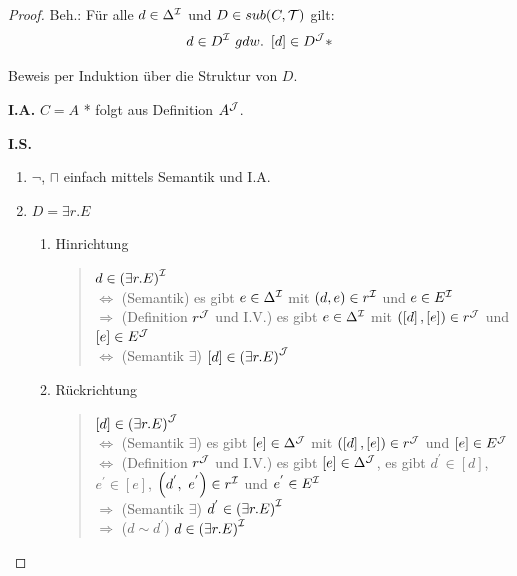 \begin{proof}
Beh.: Für alle $d \in \Delta^{\mathcal{I}}$ und $D \in sub(C,\mathcal{T})$ gilt: $$d \in D^{\MI}\ gdw.\ \left\lbrack d \right\rbrack \in D^{\MJ}*$$

Beweis per Induktion über die Struktur von $D$.

\textbf{I.A.} $C = A$ * folgt aus Definition $A^{\mathcal{J}}$.

\textbf{I.S.}

\begin{enumerate}
\def\labelenumi{\arabic{enumi}.}
\item
  $\neg$, $\sqcap$ einfach mittels Semantik und I.A.
\item
  $D = \exists r.E$

  \begin{enumerate}
  \def\labelenumii{\alph{enumii}.}
  \item
    Hinrichtung

\begin{quote}
$d \in \left( \exists r.E \right)^{\mathcal{I}}$ \\
$\Leftrightarrow$ (Semantik) es gibt $e \in \Delta^{\mathcal{I}}$ mit $\left( d,e \right) \in r^{\mathcal{I}}$ und $e \in E^{\mathcal{I}}$ \\
$\Rightarrow$ (Definition $r^{\mathcal{J}}$ und I.V.) es gibt $e \in \Delta^{\mathcal{I}}$ mit $\left( \left\lbrack d \right\rbrack,\left\lbrack e \right\rbrack \right) \in r^{\mathcal{J}}$ und $\left\lbrack e \right\rbrack \in E^{\mathcal{J}}$ \\
$\Leftrightarrow$ (Semantik $\exists$) $\left\lbrack d \right\rbrack \in \left( \exists r.E \right)^{\mathcal{J}}$
\end{quote}

\def\labelenumi{\alph{enumi}.}
\item
  Rückrichtung

\begin{quote}
$\left\lbrack d \right\rbrack \in \left( \exists r.E \right)^{\mathcal{J}}$ \\
$\Leftrightarrow$ (Semantik $\exists$) es gibt $[e] \in \Delta^{\mathcal{J}}$ mit $\left( \left\lbrack d \right\rbrack,\left\lbrack e \right\rbrack \right) \in r^{\mathcal{J}}$ und $\left\lbrack e \right\rbrack \in E^{\mathcal{J}}$ \\
$\Leftrightarrow$ (Definition $r^{\mathcal{J}}$ und I.V.) es gibt $[e] \in \Delta^{\mathcal{J}}$, es gibt $d^{'} \in \left\lbrack d \right\rbrack$, $e^{'} \in \left\lbrack e \right\rbrack$, $\left( d^{'},\ e^{'} \right) \in r^{\mathcal{I}}$ und $e^{'} \in E^{\mathcal{I}}$ \\
$\Rightarrow$ (Semantik $\exists$) $d^{'} \in \left( \exists r.E \right)^{\mathcal{I}}$ \\
$\Rightarrow$ ($d \sim d^{'}$) $d \in \left( \exists r.E \right)^{\mathcal{I}}$
\end{quote}

\end{enumerate}
\end{enumerate}
\end{proof}

